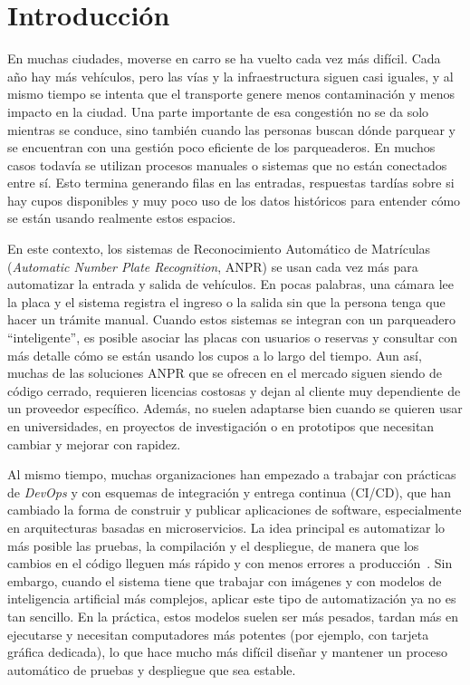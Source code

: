 \section{Introducción}

En muchas ciudades, moverse en carro se ha vuelto cada vez más difícil. Cada año hay más vehículos, pero las vías y la infraestructura siguen casi iguales, y al mismo tiempo se intenta que el transporte genere menos contaminación y menos impacto en la ciudad. Una parte importante de esa congestión no se da solo mientras se conduce, sino también cuando las personas buscan dónde parquear y se encuentran con una gestión poco eficiente de los parqueaderos. En muchos casos todavía se utilizan procesos manuales o sistemas que no están conectados entre sí. Esto termina generando filas en las entradas, respuestas tardías sobre si hay cupos disponibles y muy poco uso de los datos históricos para entender cómo se están usando realmente estos espacios.

En este contexto, los sistemas de Reconocimiento Automático de Matrículas (\textit{Automatic Number Plate Recognition}, ANPR) se usan cada vez más para automatizar la entrada y salida de vehículos. En pocas palabras, una cámara lee la placa y el sistema registra el ingreso o la salida sin que la persona tenga que hacer un trámite manual. Cuando estos sistemas se integran con un parqueadero “inteligente”, es posible asociar las placas con usuarios o reservas y consultar con más detalle cómo se están usando los cupos a lo largo del tiempo.
Aun así, muchas de las soluciones ANPR que se ofrecen en el mercado siguen siendo de código cerrado, requieren licencias costosas y dejan al cliente muy dependiente de un proveedor específico. Además, no suelen adaptarse bien cuando se quieren usar en universidades, en proyectos de investigación o en prototipos que necesitan cambiar y mejorar con rapidez.

Al mismo tiempo, muchas organizaciones han empezado a trabajar con prácticas de \textit{DevOps} y con esquemas de integración y entrega continua (CI/CD), que han cambiado la forma de construir y publicar aplicaciones de software, especialmente en arquitecturas basadas en microservicios. La idea principal es automatizar lo más posible las pruebas, la compilación y el despliegue, de manera que los cambios en el código lleguen más rápido y con menos errores a producción~\cite{devops_tools_2019,ci_cd_quality_2025}. Sin embargo, cuando el sistema tiene que trabajar con imágenes y con modelos de inteligencia artificial más complejos, aplicar este tipo de automatización ya no es tan sencillo. En la práctica, estos modelos suelen ser más pesados, tardan más en ejecutarse y necesitan computadores más potentes (por ejemplo, con tarjeta gráfica dedicada), lo que hace mucho más difícil diseñar y mantener un proceso automático de pruebas y despliegue que sea estable.

